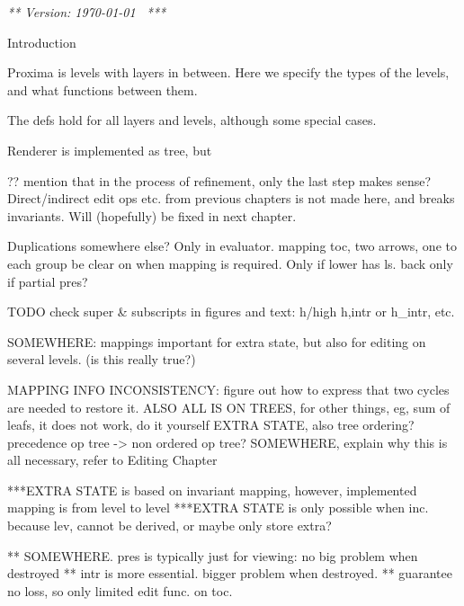 \newsavebox{\wpbox}
\sbox{\wpbox}{$\wp$}
\newcommand{\powerset}{\usebox{\wpbox}}
\renewcommand{\wp}[2]{\fn{wp}(#1,~#2)}







{\em *** Version: \today~ ***}


\bc
Introduction

Proxima is levels with layers in between.
Here we specify the types of the levels, and what functions between them.

The defs hold for all layers and levels, although some special cases.

Renderer is implemented as tree, but
\ec




\bc

?? mention that in the process of refinement, only the last step makes sense? Direct/indirect edit ops etc. from previous chapters is not made here, and breaks invariants. Will (hopefully) be fixed in next chapter.


Duplications somewhere else? Only in evaluator.
mapping toc, two arrows, one to each group
be clear on when mapping is required. Only if lower has ls. back only if partial pres?



TODO
check super & subscripts in figures and text: h/high h,intr or h_intr, etc.

SOMEWHERE: mappings important for extra state, but also for editing on several levels. (is this really true?)

MAPPING INFO INCONSISTENCY: figure out how to express that two cycles are needed to restore it.
ALSO ALL IS ON TREES, for other things, eg, sum of leafs, it does not work, do it yourself
EXTRA STATE, also tree ordering? precedence op tree -> non ordered op tree?
SOMEWHERE, explain why this is all necessary, refer to Editing Chapter


***EXTRA STATE is based on invariant mapping, however, implemented mapping is from level to level
***EXTRA STATE is only possible when inc. because lev, cannot be derived, or maybe only store extra?

** SOMEWHERE. pres is typically just for viewing: no big problem when destroyed
** intr is more essential. bigger problem when destroyed.
** guarantee no loss, so only limited edit func. on toc.

